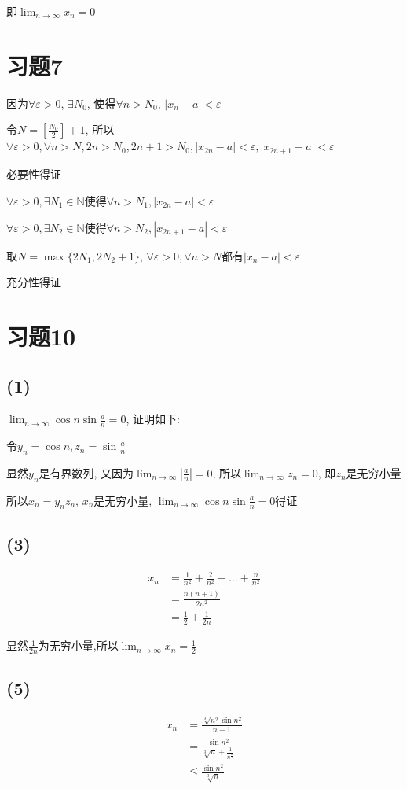 \documentclass[a4paper,11pt]{article}
\begin{document}
即$\displaystyle \lim_{n\rightarrow \infty}x_n=0$
\section*{习题7}
因为$\forall \varepsilon > 0$, $\exists N_0$, 使得$\forall n>N_0$, $|x_n-a|<\varepsilon$

令$N=[\frac{N_0}{2}]+1$, 所以$\forall \varepsilon > 0, \forall n>N, 2n > N_0, 2n+1 > N_0, |x_{2n}-a|<\varepsilon, |x_{2n+1}-a|<\varepsilon$

必要性得证

$\forall \varepsilon > 0, \exists N_1 \in \mathbb{N}$使得$\forall n>N_1, |x_{2n}-a|<\varepsilon$

$\forall \varepsilon > 0, \exists N_2 \in \mathbb{N}$使得$\forall n>N_2, |x_{2n+1}-a|<\varepsilon$

取$N=\max \{2N_1,2N_2+1\}$, $\forall \varepsilon > 0, \forall n>N$都有$|x_n-a|<\varepsilon$

充分性得证
\section*{习题10}
\subsection*{(1)}
$\displaystyle \lim_{n\rightarrow \infty} \cos n \sin \frac{a}{n} = 0$, 证明如下:

令$y_n=\cos n, z_n=\sin \frac{a}{n}$

显然$y_n$是有界数列, 又因为$\displaystyle \lim_{n\rightarrow \infty}|\frac{a}{n}|=0$, 所以$\displaystyle\lim_{n\rightarrow \infty}z_n=0$, 即$z_n$是无穷小量

所以$x_n=y_nz_n$, $x_n$是无穷小量, $\displaystyle \lim_{n\rightarrow \infty} \cos n \sin \frac{a}{n} = 0$得证
\subsection*{(3)}
\begin{align*}
	x_n&=\frac{1}{n^2}+\frac{2}{n^2}+\dots+\frac{n}{n^2}\\
	&=\frac{n(n+1)}{2n^2}\\
	&=\frac{1}{2}+\frac{1}{2n}
\end{align*}

显然$\frac{1}{2n}$为无穷小量,所以$\displaystyle \lim_{n\rightarrow \infty}x_n=\frac{1}{2}$
\subsection*{(5)}
\begin{align*}
	\displaystyle x_n&=\frac{\sqrt[3]{n^2}\sin n^2}{n+1}\\
	&=\frac{\sin n^2}{\sqrt[3]{n}+\frac{1}{n^{\frac{2}{3}}}}\\
	&\le \frac{\sin n^2}{\sqrt[3]{n}}
\end{align*}
\end{document}
